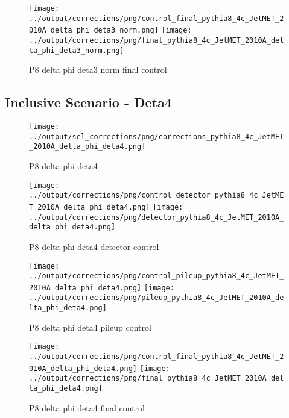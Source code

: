 \documentclass[11pt]{book}
\begin{document}
\begin{figure}[ht]
\centering
\texttt{[image: ../output/corrections/png/control\_final\_pythia8\_4c\_JetMET\_2010A\_delta\_phi\_deta3\_norm.png]}
\texttt{[image: ../output/corrections/png/final\_pythia8\_4c\_JetMET\_2010A\_delta\_phi\_deta3\_norm.png]}
\caption{P8 delta phi deta3 norm final control}
\label{fig:p8_JetMET_2010A_delta_phi_deta3_norm_final_control}
\end{figure}


\clearpage
\subsection{Inclusive Scenario - Deta4}

\begin{figure}[ht]
\centering
\texttt{[image: ../output/sel\_corrections/png/corrections\_pythia8\_4c\_JetMET\_2010A\_delta\_phi\_deta4.png]}
\caption{P8 delta phi deta4}
\label{fig:p8_JetMET_2010A_delta_phi_deta4}
\end{figure}


\begin{figure}[ht]
\centering
\texttt{[image: ../output/corrections/png/control\_detector\_pythia8\_4c\_JetMET\_2010A\_delta\_phi\_deta4.png]}
\texttt{[image: ../output/corrections/png/detector\_pythia8\_4c\_JetMET\_2010A\_delta\_phi\_deta4.png]}
\caption{P8 delta phi deta4 detector control}
\label{fig:p8_JetMET_2010A_delta_phi_deta4_detector_control}
\end{figure}

\begin{figure}[ht]
\centering
\texttt{[image: ../output/corrections/png/control\_pileup\_pythia8\_4c\_JetMET\_2010A\_delta\_phi\_deta4.png]}
\texttt{[image: ../output/corrections/png/pileup\_pythia8\_4c\_JetMET\_2010A\_delta\_phi\_deta4.png]}
\caption{P8 delta phi deta4 pileup control}
\label{fig:p8_JetMET_2010A_delta_phi_deta4_pileup_control}
\end{figure}


\begin{figure}[ht]
\centering
\texttt{[image: ../output/corrections/png/control\_final\_pythia8\_4c\_JetMET\_2010A\_delta\_phi\_deta4.png]}
\texttt{[image: ../output/corrections/png/final\_pythia8\_4c\_JetMET\_2010A\_delta\_phi\_deta4.png]}
\caption{P8 delta phi deta4 final control}
\label{fig:p8_JetMET_2010A_delta_phi_deta4_final_control}
\end{figure}
\end{document}
